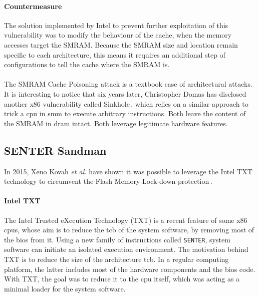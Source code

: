 \paragraph{Countermeasure}
%
The solution implemented by Intel to prevent further exploitation of this
vulnerability was to modify the behaviour of the cache, when the memory accesses
target the SMRAM.
%
Because the SMRAM size and location remain specific to each architecture, this
means it requires an additional step of configurations to tell the cache where
the SMRAM is. 
%

\paragraph{}
%
The SMRAM Cache Poisoning attack is a textbook case  of architectural attacks.
%
It is interesting to notice that six years later, Christopher Domas has
disclosed another x86 vulnerability called Sinkhole\,\cite{domas2015sinkhole},
which relies on a similar approach to trick a \ac{cpu} in \ac{smm} to execute
arbitrary instructions.
%
Both leave the content of the SMRAM in \ac{dram} intact.
%
Both leverage legitimate hardware features.


\subsection{SENTER Sandman}
\label{subsec:usecase:hse:sandman}

In 2015, Xeno Kovah \emph{et al.} have shown  it was possible to leverage the
Intel TXT technology to circumvent the Flash Memory Lock-down
protection\,\cite{kovah2015senter}.

\paragraph{Intel TXT}
The Intel Trusted eXecution Technology (TXT) is a recent feature of some x86
\acp{cpu}, whose aim is to reduce the \ac{tcb} of the system software, by
removing most of the \ac{bios} from it.
%
Using a new family of instructions called \texttt{SENTER}, system software can
initiate an isolated execution environment.
%
The motivation behind TXT is to reduce the size of the architecture \ac{tcb}.
%
In a regular computing platform, the latter includes most of the hardware
components and the \ac{bios} code.
%
With TXT, the goal was to reduce it to the \ac{cpu} itself, which was acting as
a minimal loader for the system software.

